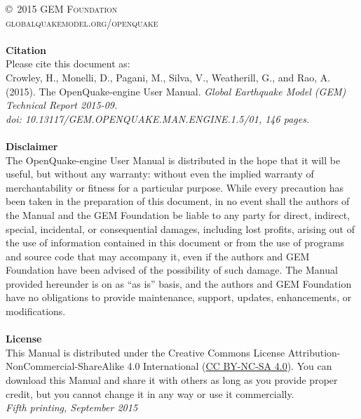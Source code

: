 \documentclass[11pt,fleqn]{book} %
\begin{document}
\noindent \copyright\ \textsc{2015 GEM Foundation}\\ %
\noindent \textsc{globalquakemodel.org/openquake}\\ %
\noindent \hfill\\
\noindent
   {\textbf{Citation}} \hfill \\
   Please cite this document as: \hfill \\
   Crowley, H., Monelli, D., Pagani, M., Silva, V., 
   Weatherill, G., and Rao, A. (2015). 
   The OpenQuake-engine User Manual. 
   \textit{Global Earthquake Model (GEM) Technical Report 2015-09.\\ 
   doi: 10.13117/GEM.OPENQUAKE.MAN.ENGINE.1.5/01, 146 pages.} \hfill \\
\noindent \hfill\\
\noindent
   {\bf{Disclaimer}} \hfill \\
   The OpenQuake-engine User Manual is distributed in the hope that it will be 
   useful, but without any warranty: without even the implied warranty of 
   merchantability or fitness for a particular purpose. While every precaution 
   has been taken in the preparation of this document, in no event shall the 
   authors of the Manual and the GEM Foundation be liable to any party for 
   direct, indirect, special, incidental, or consequential damages, including 
   lost profits, arising out of the use of information contained in this 
   document or from the use of programs and source code that may accompany it, 
   even if the authors and GEM Foundation have been advised of the possibility 
   of such damage. The Manual provided hereunder is on as ``as is'' basis, and the 
   authors and GEM Foundation have no obligations to provide maintenance, 
   support, updates, enhancements, or modifications. \hfill \\
\noindent \hfill\\
\noindent
   {\bf{License}} \hfill \\
   This Manual is distributed under the Creative Commons License 
   Attribution-NonCommercial-ShareAlike 4.0 International 
   (\href{http://creativecommons.org/licenses/by-nc-sa/4.0/}
   {CC BY-NC-SA 4.0}). 
   You can download this Manual and share it with 
   others as long as you provide proper credit, but you cannot change 
   it in any way or use it commercially.\hfill \\

\noindent \textit{Fifth printing, September 2015} %
\end{document}
